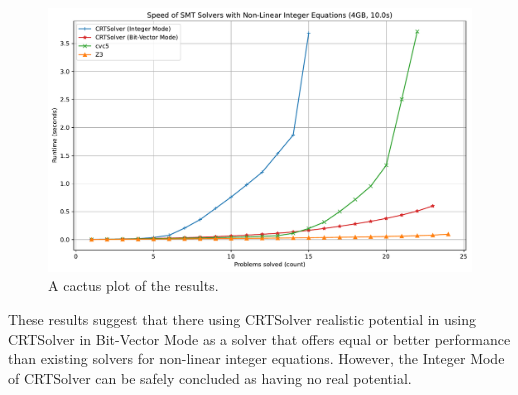 \begin{figure}
    \vspace{4em}
    \centering
    \includegraphics[width=1.0\linewidth]{cactus.pdf}
  \caption{A cactus plot of the results.}
  \label{figure:cactus-plot}
\end{figure}

These results suggest that there using CRTSolver realistic potential in using CRTSolver in Bit-Vector Mode
as a solver that offers equal or better performance than existing solvers for non-linear
integer equations. However, the Integer Mode of CRTSolver can be safely concluded as having no real potential.
